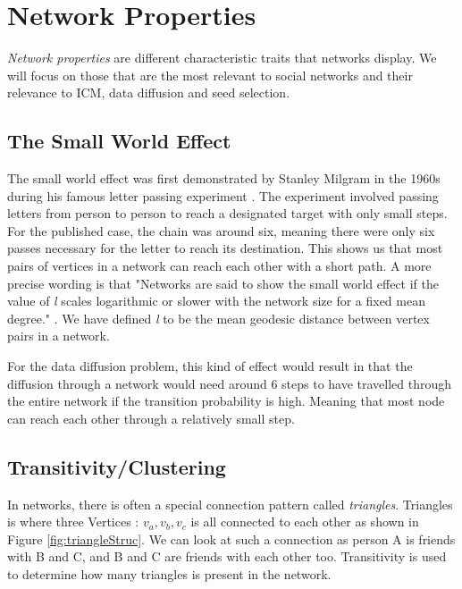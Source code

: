 \section{Network Properties}
\textit{Network properties} are different characteristic traits that networks display. We will focus on those that are the most relevant to social networks and their relevance to ICM, data diffusion and seed selection.


\subsection{The Small World Effect} \label{sec:SmallWorldeffect}
The small world effect was first demonstrated by Stanley Milgram in the 1960s during his famous letter passing experiment \cite{SmallWorldProblemSmilgram1960}. The experiment involved passing letters from person to person to reach a designated target with only small steps. For the published case, the chain was around six\cite{Experiment1969}, meaning there were only six passes necessary for the letter to reach its destination. This shows us that most pairs of vertices in a network can reach each other with a short path. A more precise wording is that "Networks are said to show the small world effect if the value of \textit{l} scales logarithmic or slower with the network size for a fixed mean degree." \cite{ComplexNetwork2003}. We have defined \textit{l}  to be the mean geodesic distance between vertex pairs in a network.

For the data diffusion problem, this kind of effect would result in that the diffusion through a network would need around 6 steps to have travelled through the entire network if the transition probability is high. Meaning that most node can reach each other through a relatively small step.

\subsection{Transitivity/Clustering}
In networks, there is often a special connection pattern called \textit{triangles}. Triangles is where three Vertices : $v_a,v_b,v_c$ is all connected to each other as shown in Figure \ref{fig:triangleStruc}. We can look at such a connection as person A is friends with B and C, and B and C are friends with each other too. Transitivity is used to determine how many triangles is present in the network.  

